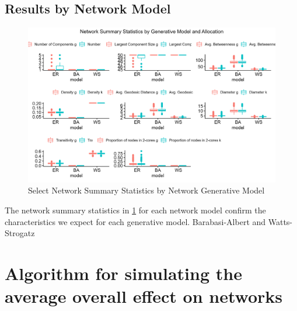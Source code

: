 \documentclass{article}
\theoremstyle{definition}
\begin{document}
\subsection{Results by Network Model}
\begin{figure}[H]
    \centering
    \includegraphics[width=\linewidth]{Original Figures/Network Summary Statistics.png}
    \caption{Select Network Summary Statistics by Network Generative Model}
    \label{fig:Figure B1}
\end{figure}

The network summary statistics in \ref{fig:Figure B1} for each network model confirm the characteristics we expect for each generative model. Barabasi-Albert and Watts-Strogatz
\newpage
\section{Algorithm for simulating the average overall effect on networks}
\label{Appendix 3}
\end{document}
